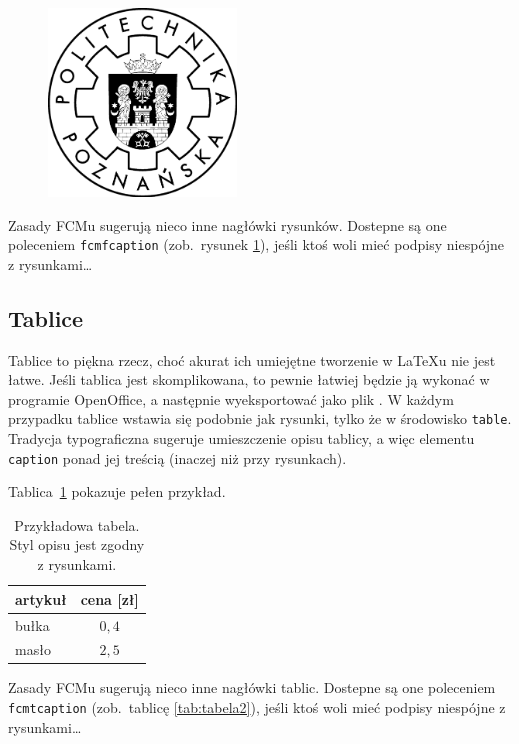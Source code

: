 \begin{figure}[t]
\centering\includegraphics[width=5cm]{figures/template/logo-pp}
\label{rys:plama2}
\end{figure}

Zasady FCMu sugerują nieco inne nagłówki rysunków. Dostepne są one poleceniem \texttt{fcmfcaption} (zob.~rysunek
\ref{rys:plama2}), jeśli ktoś woli mieć podpisy niespójne z rysunkami\ldots

\subsection{Tablice}

Tablice to piękna rzecz, choć akurat ich umiejętne tworzenie w \LaTeX{}u nie jest łatwe. 
Jeśli tablica jest skomplikowana, to pewnie łatwiej będzie ją wykonać w programie
OpenOffice, a następnie wyeksportować jako plik . W każdym przypadku tablice wstawia się podobnie
jak rysunki, tylko że w środowisko \texttt{table}. Tradycja typograficzna sugeruje umieszczenie opisu tablicy, a więc
elementu \texttt{caption} ponad jej treścią (inaczej niż przy rysunkach).  

Tablica~\ref{tab:tabela} pokazuje pełen przykład.

\begin{table}[h]
\caption{Przykładowa tabela. Styl opisu jest zgodny z rysunkami.}\label{tab:tabela}
\centering\footnotesize%
\begin{tabular}{l c}
\toprule
artykuł & cena [zł] \\
\midrule
bułka   & $0,4$ \\
masło   & $2,5$ \\
\bottomrule
\end{tabular}
\end{table}

Zasady FCMu sugerują nieco inne nagłówki tablic. Dostepne są one poleceniem \texttt{fcmtcaption} (zob.~tablicę
\ref{tab:tabela2}), jeśli ktoś woli mieć podpisy niespójne z rysunkami\ldots

